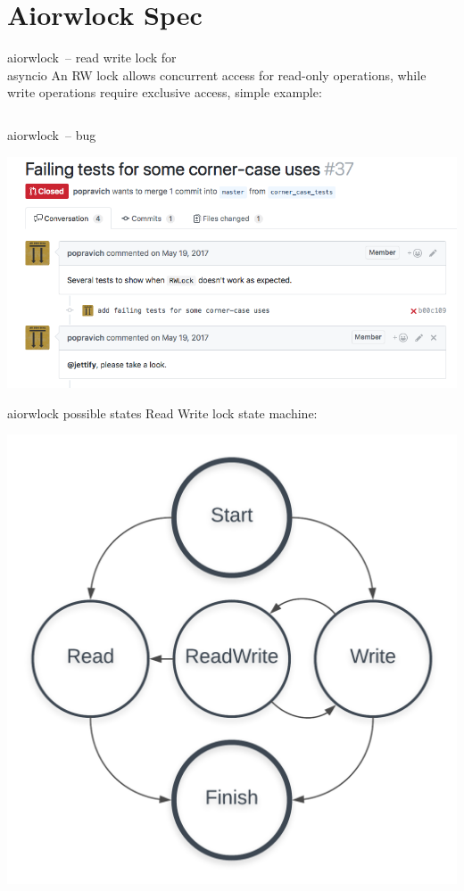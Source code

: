 \documentclass[12pt]{beamer}
\begin{document}
  \section{Aiorwlock Spec}
  \begin{frame}[fragile]{aiorwlock~-- read write lock for \\ asyncio}
      An RW lock allows concurrent access for read-only operations,
      while write operations require exclusive access, simple example:
      \inputminted[linenos,fontsize=\scriptsize]{python}{figures/lock.py}
  \end{frame}
  \begin{frame}{aiorwlock~-- bug}
      \begin{center}
        \includegraphics[scale=0.40]{figures/aiorwlock_bug}
      \end{center}
  \end{frame}
  \begin{frame}{aiorwlock possible states}
      Read Write lock state machine:
      \begin{center}
          \includegraphics[scale=0.15]{figures/task_states2}
      \end{center}
  \end{frame}
\end{document}

